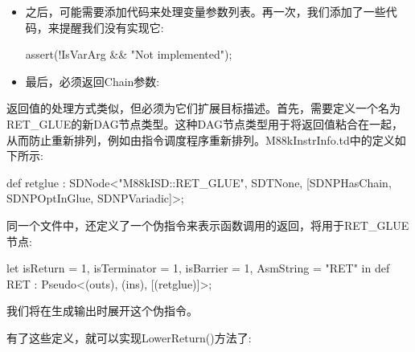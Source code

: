 \begin{itemize}
\begin{cpp}
        } else {
            llvm_unreachable("Not implemented");
        }
    }
\end{cpp}

\item
之后，可能需要添加代码来处理变量参数列表。再一次，我们添加了一些代码，来提醒我们没有实现它:

\begin{cpp}
    assert(!IsVarArg && "Not implemented");
\end{cpp}

\item
最后，必须返回Chain参数:

\begin{cpp}
    return Chain;
}
\end{cpp}
\end{itemize}


返回值的处理方式类似，但必须为它们扩展目标描述。首先，需要定义一个名为RET\_GLUE的新DAG节点类型。这种DAG节点类型用于将返回值粘合在一起，从而防止重新排列，例如由指令调度程序重新排列。M88kInstrInfo.td中的定义如下所示:

\begin{cpp}
def retglue : SDNode<"M88kISD::RET_GLUE", SDTNone,
                [SDNPHasChain, SDNPOptInGlue, SDNPVariadic]>;
\end{cpp}

同一个文件中，还定义了一个伪指令来表示函数调用的返回，将用于RET\_GLUE节点:

\begin{cpp}
let isReturn = 1, isTerminator = 1, isBarrier = 1,
        AsmString = "RET" in
    def RET : Pseudo<(outs), (ins), [(retglue)]>;
\end{cpp}

我们将在生成输出时展开这个伪指令。

有了这些定义，就可以实现LowerReturn()方法了:

